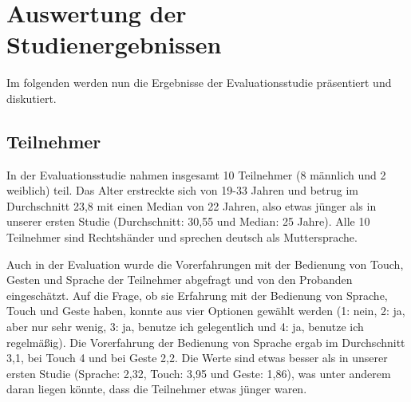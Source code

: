 \section[Auswertung der Studienergebnissen]{Auswertung der Studienergebnissen}
Im folgenden werden nun die Ergebnisse der Evaluationsstudie präsentiert und diskutiert. 
\subsection[Teilnehmer]{Teilnehmer}
In der Evaluationsstudie nahmen insgesamt 10 Teilnehmer (8 männlich und 2 weiblich) teil. Das Alter erstreckte sich von 19-33 Jahren und betrug im Durchschnitt 23,8 mit einen Median von 22 Jahren, also etwas jünger als in unserer ersten Studie (Durchschnitt: 30,55 und Median: 25 Jahre). Alle 10 Teilnehmer sind Rechtshänder und sprechen deutsch als Muttersprache.

Auch in der Evaluation wurde die Vorerfahrungen mit der Bedienung von Touch, Gesten und Sprache der Teilnehmer abgefragt und von den Probanden eingeschätzt. Auf die Frage, ob sie Erfahrung mit der Bedienung von Sprache, Touch und Geste haben, konnte aus vier Optionen gewählt werden (1: nein, 2: ja, aber nur sehr wenig, 3: ja, benutze ich gelegentlich und 4: ja, benutze ich regelmäßig). Die Vorerfahrung der Bedienung von Sprache ergab im Durchschnitt 3,1, bei Touch 4 und bei Geste 2,2. Die Werte sind etwas besser als in unserer ersten Studie (Sprache: 2,32,  Touch: 3,95 und Geste: 1,86), was unter anderem daran liegen könnte, dass die Teilnehmer etwas jünger waren.

